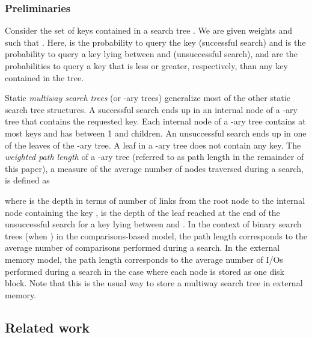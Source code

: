 \documentclass{llncs}\usepackage[english]{babel}
\begin{document}
\subsubsection*{Preliminaries}

Consider the set  of keys contained in a search tree . We are given  weights  and  such that . Here,  is the probability to query the key  (successful search) and  is the probability to query a key lying between  and  (unsuccessful search),  and  are the probabilities to query a key that is less or greater, respectively, than any key contained in the tree. 

Static \emph{multiway search trees} (or -ary trees) generalize most of the other static search tree structures. A successful search ends up in an internal node of a -ary tree that contains the requested key. Each internal node of a -ary tree contains at most  keys and has between 1 and  children. An unsuccessful search ends up in one of the  leaves of the -ary tree. A leaf in a -ary tree does not contain any key. The \emph{weighted path length} of a -ary tree  (referred to as path length in the remainder of this paper), a measure of the average number of nodes traversed during a search, is defined as 

where  is the depth in terms of number of links from the root node to the internal node containing the key ,  is the depth of the leaf reached at the end of the unsuccessful search for a key lying between  and . In the context of binary search trees (when ) in the comparisons-based model, the path length corresponds to the average number of comparisons performed during a search. In the external memory model, the path length corresponds to the average number of I/Os performed during a search in the case where each node is stored as one disk  block. Note that this is the usual way to store a multiway search tree in external memory. 

\subsection{Related work}
\end{document}
